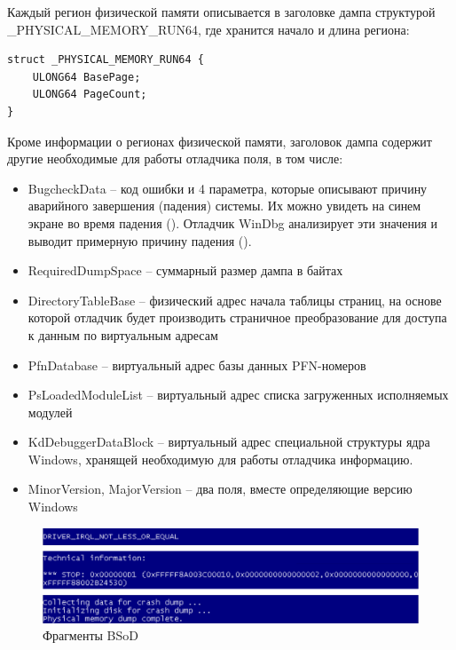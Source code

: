 \documentclass{mipt-thesis-bs}
\begin{document}
Каждый регион физической памяти описывается в заголовке дампа структурой {\_}PHYSICAL{\_}MEMORY{\_}RUN64, где хранится начало и длина региона:

\begin{verbatim}
struct _PHYSICAL_MEMORY_RUN64 {
    ULONG64 BasePage;
    ULONG64 PageCount;
}
\end{verbatim}

Кроме информации о регионах физической памяти, заголовок дампа содержит другие необходимые для работы отладчика поля, в том числе:

\begin{itemize}
        \item BugcheckData -- код ошибки и 4 параметра, которые описывают причину аварийного завершения (падения) системы. Их можно увидеть на синем экране во время падения (). Отладчик WinDbg анализирует эти значения и выводит примерную причину падения ().
    \item RequiredDumpSpace -- суммарный размер дампа в байтах
    \item DirectoryTableBase -- физический адрес начала таблицы страниц, на основе которой отладчик будет производить страничное преобразование для доступа к данным по виртуальным адресам
    \item PfnDatabase -- виртуальный адрес базы данных PFN-номеров\cite{winternals2}
    \item PsLoadedModuleList -- виртуальный адрес списка загруженных исполняемых модулей
    \item KdDebuggerDataBlock -- виртуальный адрес специальной структуры ядра Windows, хранящей необходимую для работы отладчика информацию.
    \item MinorVersion, MajorVersion -- два поля, вместе определяющие версию Windows
\end{itemize}

\begin{figure}[h]
\begin{center}
    \includegraphics[width=1\textwidth]{dump.png}
    \caption{Фрагменты BSoD}
    \label{fig:bsod}
\end{center}
\end{figure}
\end{document}
